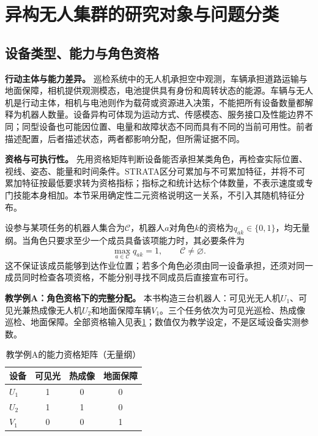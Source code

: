 \section{异构无人集群的研究对象与问题分类}
\label{sec:01_06}

\subsection{设备类型、能力与角色资格}

\textbf{行动主体与能力差异。}
巡检系统中的无人机承担空中观测，车辆承担道路运输与地面保障，相机提供观测模态，电池提供具有身份和周转状态的能源。车辆与无人机是行动主体，相机与电池则作为载荷或资源进入决策，不能把所有设备数量都解释为机器人数量。设备异构可体现为运动方式、传感模态、服务接口及性能边界不同；同型设备也可能因位置、电量和故障状态不同而具有不同的当前可用性。前者描述配置，后者描述状态，两者都影响分配，但所需证据不同。

\textbf{资格与可执行性。}
先用资格矩阵判断设备能否承担某类角色，再检查实际位置、视线、姿态、能量和时间条件。STRATA区分可累加与不可累加特征，并将不可累加特征按最低要求转为资格指标；指标之和统计达标个体数量，不表示速度或专门技能本身相加\cite{STRATA2020}。本节采用确定性二元资格说明这一关系，不引入其随机特征分布。

设参与某项任务的机器人集合为$\mathcal C$，机器人$a$对角色$k$的资格为$q_{ak}\in\{0,1\}$，均无量纲。当角色只要求至少一个成员具备该项能力时，其必要条件为
\begin{equation}
\max_{a\in\mathcal C}q_{ak}=1,
\qquad \mathcal C\ne\varnothing.
\label{s0106:role_presence}
\end{equation}
这不保证该成员能够到达作业位置；若多个角色必须由同一设备承担，还须对同一成员同时检查各项资格，不能分别寻找不同成员后直接宣布可行。

\textbf{教学例A：角色资格下的完整分配。}
本书构造三台机器人：可见光无人机$U_1$、可见光兼热成像无人机$U_2$和地面保障车辆$V_1$。三个任务依次为可见光巡检、热成像巡检、地面保障。全部资格输入见表\ref{s0106:eligibility}；数值仅为教学设定，不是区域设备实测参数。
\begin{table}[htbp]
\centering
\caption{教学例A的能力资格矩阵（无量纲）}
\label{s0106:eligibility}
\begin{tabular}{lccc}
\toprule
设备 & 可见光 & 热成像 & 地面保障 \\
\midrule
$U_1$ & 1 & 0 & 0 \\
$U_2$ & 1 & 1 & 0 \\
$V_1$ & 0 & 0 & 1 \\
\bottomrule
\end{tabular}
\end{table}

